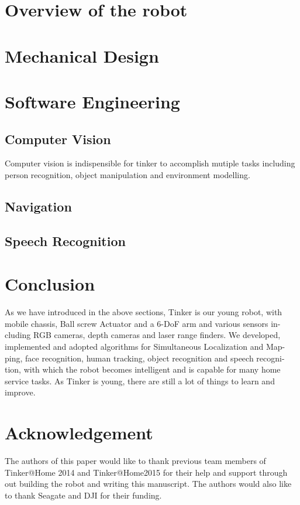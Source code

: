 \documentclass[runningheads,a4paper]{llncs}
\begin{document}
\section{Overview of the robot}



\section{Mechanical Design}


\section{Software Engineering}
\subsection{Computer Vision}
Computer vision is indispensible for tinker to accomplish mutiple tasks including person recognition, object manipulation and environment modelling.


\subsection{Navigation}


\subsection{Speech Recognition}




\section{Conclusion}

As we have introduced in the above sections, Tinker is our young robot, with mobile chassis, Ball screw Actuator and a 6-DoF arm and various sensors in- cluding RGB cameras, depth cameras and laser range finders. We developed, implemented and adopted algorithms for Simultaneous Localization and Map- ping, face recognition, human tracking, object recognition and speech recogni- tion, with which the robot becomes intelligent and is capable for many home service tasks. As Tinker is young, there are still a lot of things to learn and improve.


\section*{Acknowledgement}
The authors of this paper would like to thank previous team members of Tinker@Home 2014 and Tinker@Home2015 for their help and support through out building the robot and writing this manuscript. The authors would also like to thank Seagate and DJI for their funding. 



\end{document}
